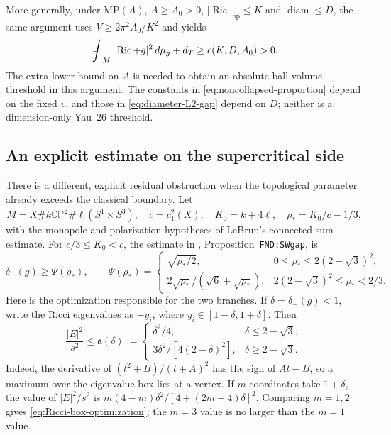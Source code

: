 \documentclass[a4paper,11pt]{article}
\numberwithin{equation}{section}
\theoremstyle{definition}
\newcommand{\Ric}{\operatorname{Ric}}
\newcommand{\diam}{\operatorname{diam}}
\newcommand{\op}{\mathrm{op}}
\newcommand{\CP}{\mathbb{CP}}
\newcommand{\dd}{\,d\mu_g}
\newcommand{\fint}{\mathop{\rlap{\,\raisebox{0.1ex}{\tiny$-$}}\int}\nolimits}
\begin{document}
More generally, under $\mathrm{MP}(A)$, $A\ge A_0>0$, $|\Ric|_{\op}\le K$ and $\diam\le D$, the same argument uses
$V\ge2\pi^2A_0/K^2$ and yields
\begin{equation}\label{eq:diameter-L2-gap}
\fint_M|\Ric+g|^2\dd+d_T\ge c(K,D,A_0)>0.
\end{equation}
The extra lower bound on $A$ is needed to obtain an absolute ball-volume threshold in this argument. The constants in \eqref{eq:noncollapsed-proportion} depend on the fixed $v$, and those in \eqref{eq:diameter-L2-gap} depend on $D$; neither is a dimension-only Yau~26 threshold.

\subsection{An explicit estimate on the supercritical side}\label{sec:supercritical-gap}
There is a different, explicit residual obstruction when the topological parameter already exceeds the classical boundary. Let
\[
M=X\#k\overline{\CP^2}\#\ell(S^1\times S^3),\quad
c=c_1^2(X),\quad K_0=k+4\ell,\quad
\rho_*=K_0/c-1/3,
\]
with the monopole and polarization hypotheses of LeBrun's connected-sum estimate\cite{LeBrun2001}. For $c/3\le K_0<c$, the estimate in , Proposition~\texttt{FND:SWgap}, is
\begin{equation}\label{eq:supercritical-explicit}
\delta_-(g)\ge\Psi(\rho_*),\qquad
\Psi(\rho_*)=
\begin{cases}
\sqrt{\rho_*/2},&0\le\rho_*\le2(2-\sqrt3)^2,\\[1mm]
2\sqrt{\rho_*}/(\sqrt6+\sqrt{\rho_*}),
&2(2-\sqrt3)^2\le\rho_*<2/3.
\end{cases}
\end{equation}
Here is the optimization responsible for the two branches. If $\delta=\delta_-(g)<1$, write the Ricci eigenvalues as $-y_i$, where $y_i\in[1-\delta,1+\delta]$. Then
\begin{equation}\label{eq:Ricci-box-optimization}
\frac{|E|^2}{s^2}\le\mathfrak a(\delta):=
\begin{cases}
\delta^2/4,&\delta\le2-\sqrt3,\\
3\delta^2/[4(2-\delta)^2],&\delta\ge2-\sqrt3.
\end{cases}
\end{equation}
Indeed, the derivative of $(t^2+B)/(t+A)^2$ has the sign of $At-B$, so a maximum over the eigenvalue box lies at a vertex. If $m$ coordinates take $1+\delta$, the value of $|E|^2/s^2$ is
$m(4-m)\delta^2/[4+(2m-4)\delta]^2$. Comparing $m=1,2$ gives \eqref{eq:Ricci-box-optimization}; the $m=3$ value is no larger than the $m=1$ value.
\end{document}
